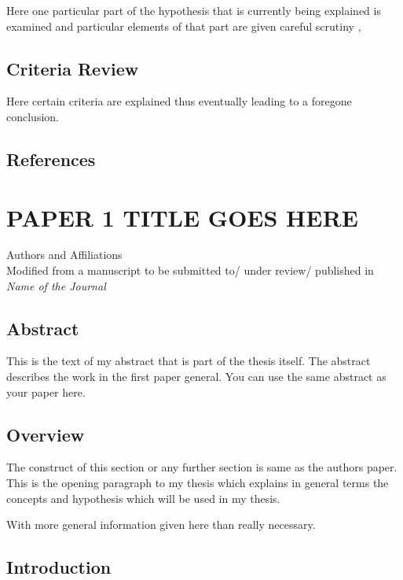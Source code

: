\documentclass[
  12pt,
  notitlepage]{isuthesis}
\begin{document}
Here one particular part of the hypothesis that is
currently being explained is examined and particular
elements of that part are given careful scrutiny
\cite{allen}, \cite{bruner}

\section{Criteria Review}

Here certain criteria are explained thus eventually
leading to a foregone conclusion.

\section{References}
\printbibliography[heading=none, section=1]
\endrefsection

\chapter{PAPER 1 TITLE GOES HERE}

\label{polymer_fibers}

\begin{center}
    Authors and Affiliations \\
    Modified from a manuscript to be submitted to/ under review/ published in \textit{Name of the Journal} 
\end{center}

\section{Abstract}

This is the text of my abstract that is part of the thesis itself.
The abstract describes the work in the first paper general. You can use the same abstract as your paper here.

\section{Overview}

The construct of this section or any further section is same as the authors paper.
This is the opening paragraph to my thesis which
explains in general terms the concepts and hypothesis
which will be used in my thesis.

With more general information given here than really
necessary.

\section{Introduction}
\end{document}
